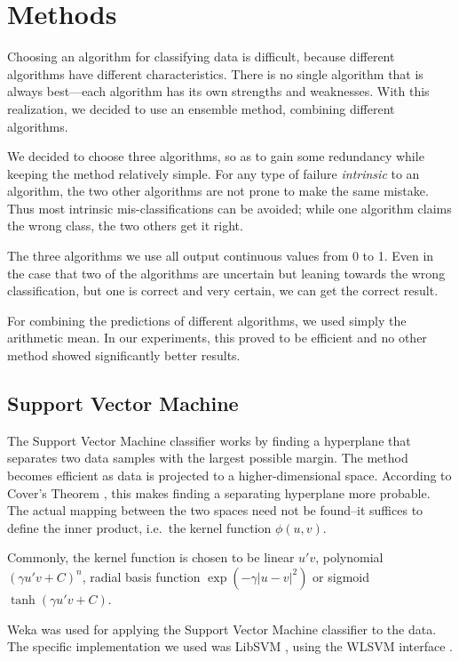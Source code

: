 \section{Methods} \label{sec:methods}

Choosing an algorithm for classifying data is difficult, because
different algorithms have different characteristics. There is no single
algorithm that is always best---each algorithm has its own strengths and
weaknesses. With this realization, we decided to use an ensemble method,
combining different algorithms.

We decided to choose three algorithms, so as to gain some redundancy
while keeping the method relatively simple. For any type of failure
\emph{intrinsic} to an algorithm, the two other algorithms are not prone
to make the same mistake. Thus most intrinsic mis-classifications can be
avoided; while one algorithm claims the wrong class, the two others get
it right.

The three algorithms we use all output continuous values from 0 to 1. Even in the
case that two of the algorithms are uncertain but leaning towards the
wrong classification, but one is correct and very certain, we can get
the correct result.

For combining the predictions of different algorithms, we used simply
the arithmetic mean. In our experiments, this proved to be efficient and
no other method showed significantly better results.

\subsection{Support Vector Machine}

The Support Vector Machine classifier works by finding a hyperplane that
separates two data samples with the largest possible margin. The method
becomes efficient as data is projected to a higher-dimensional space.
According to Cover's Theorem \cite{cover1965geometrical}, this makes finding a separating hyperplane
more probable. The actual mapping between the two spaces need not be
found--it suffices to define the inner product, i.e.~the kernel function
$\phi(u,v)$. \cite{cortes1995support}

Commonly, the kernel function is chosen to be linear $u' v$,
polynomial $(\gamma u' v + C)^n$, radial basis function
$\exp(-\gamma |u-v|^2)$ or sigmoid
$\tanh(\gamma u' v + C)$.

Weka \cite{weka} was used for applying the Support Vector Machine
classifier to the data. The specific implementation we used was LibSVM
\cite{libsvm}, using the WLSVM interface \cite{wlsvm}.

